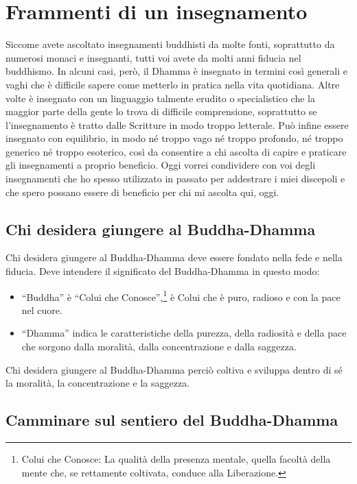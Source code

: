 \chapter{Frammenti di un insegnamento}

Siccome avete ascoltato insegnamenti buddhisti da molte fonti,
soprattutto da numerosi monaci e insegnanti, tutti voi avete da molti
anni fiducia nel buddhismo. In alcuni casi, però, il Dhamma è insegnato
in termini così generali e vaghi che è difficile sapere come metterlo in
pratica nella vita quotidiana. Altre volte è insegnato con un linguaggio
talmente erudito o specialistico che la maggior parte della gente lo
trova di difficile comprensione, soprattutto se l'insegnamento è tratto
dalle Scritture in modo troppo letterale. Può infine essere insegnato
con equilibrio, in modo né troppo vago né troppo profondo, né troppo
generico né troppo esoterico, così da consentire a chi ascolta di capire
e praticare gli insegnamenti a proprio beneficio. Oggi vorrei
condividere con voi degli insegnamenti che ho spesso utilizzato in
passato per addestrare i miei discepoli e che spero possano essere di
beneficio per chi mi ascolta qui, oggi.

\section{Chi desidera giungere al Buddha-Dhamma}

Chi desidera giungere al Buddha-Dhamma deve essere fondato nella fede e
nella fiducia. Deve intendere il significato del Buddha-Dhamma in questo
modo:

\begin{itemize}

\item ``Buddha'' è ``Colui che Conosce'',\footnote{Colui che Conosce: La qualità
    della presenza mentale, quella facoltà della mente che, se rettamente
    coltivata, conduce alla Liberazione.} è Colui che è puro, radioso e con la
  pace nel cuore.

\item ``Dhamma'' indica le caratteristiche della purezza, della radiosità e
  della pace che sorgono dalla moralità, dalla concentrazione e dalla saggezza.

\end{itemize}

Chi desidera giungere al Buddha-Dhamma perciò coltiva e sviluppa dentro
di sé la moralità, la concentrazione e la saggezza.

\section{Camminare sul sentiero del Buddha-Dhamma}

